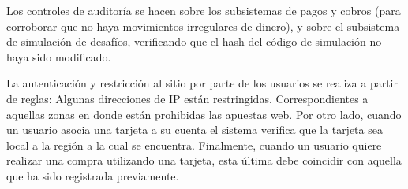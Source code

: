 Los controles de auditoría se hacen sobre los subsistemas de pagos y cobros (para corroborar que no haya movimientos irregulares de dinero), y sobre el subsistema de simulación de
desafíos, verificando que el hash del código de simulación no haya sido modificado.

La autenticación y restricción al sitio por parte de los usuarios se realiza a partir de reglas: Algunas direcciones de IP están restringidas. Correspondientes a aquellas zonas en donde
están prohibidas las apuestas web. Por otro lado, cuando un usuario asocia una tarjeta a su cuenta el sistema verifica que la tarjeta sea local a la región a la cual se encuentra.
Finalmente, cuando un usuario quiere realizar una compra utilizando una tarjeta, esta última debe coincidir con aquella que ha sido registrada previamente.


